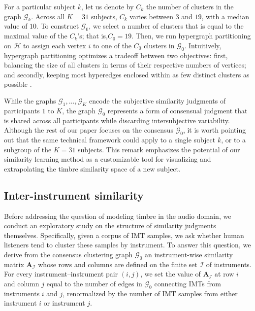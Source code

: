 \documentclass{bmcart}
\begin{document}
For a particular subject $k$, let us denote by $C_k$ the number of clusters in the graph $\mathcal{G}_k$.
Across all $K=31$ subjects, $C_k$ varies between $3$ and $19$, with a median value of $10$.
To construct $\mathcal{G}_0$, we select a number of clusters that is equal to the maximal value of the $C_k$'s; that is,$C_0 = 19$.
Then, we run hypergraph partitioning on $\mathcal{H}$ to assign each vertex $i$ to one of the $C_0$ clusters in $\mathcal{G}_0$.
Intuitively, hypergraph partitioning optimizes a tradeoff between two objectives: first, balancing the size of all clusters in terms of their respective numbers of vertices; and secondly, keeping most hyperedges enclosed within as few distinct clusters as possible \cite{han1997scalable,strehl2002cluster}.

While the graphs $\mathcal{G}_1, \ldots, \mathcal{G}_K$ encode the subjective similarity judgments of participants $1$ to $K$, the graph $\mathcal{G}_0$ represents a form of consensual judgment that is shared across all participants while discarding intersubjective variability.
Although the rest of our paper focuses on the consensus $\mathcal{G}_0$, it is worth pointing out that the same technical framework could apply to a single subject $k$, or to a subgroup of the $K=31$ subjects.
This remark emphasizes the potential of our similarity learning method as a customizable tool for visualizing and extrapolating the timbre similarity space of a new subject.

\subsection*{Inter-instrument similarity}

Before addressing the question of modeling timbre in the audio domain, we conduct an exploratory study on the structure of similarity judgments themselves.
Specifically, given a corpus of IMT samples, we ask whether human listeners tend to cluster these samples by instrument.
To answer this question, we derive from the consensus clustering graph $\mathcal{G}_0$ an instrument-wise similarity matrix $\mathbf{A}_{\mathcal{I}}$ whose rows and columns are defined on the finite set $\mathcal{I}$ of instruments.
For every instrument--instrument pair $(i,j)$, we set the value of $\mathbf{A}_{\mathcal{I}}$ at row $i$ and column $j$ equal to the number of edges in $\mathcal{G}_0$ connecting IMTs from instruments $i$ and $j$, renormalized by the number of IMT samples from either instrument $i$ or instrument $j$.
\end{document}
